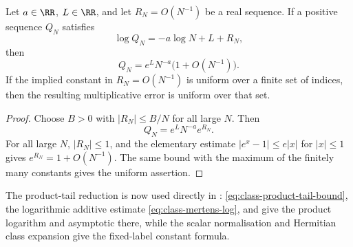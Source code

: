 \begin{lemma}
  \label{lem:class-product-log-to-product-error}
  Let \(a\in\RR\), \(L\in\RR\), and let \(R_N=O(N^{-1})\) be a real sequence.
  If a positive sequence \(Q_N\) satisfies
  \[
    \log Q_N=-a\log N+L+R_N,
  \]
  then
  \[
    Q_N=e^L N^{-a}\bigl(1+O(N^{-1})\bigr).
  \]
  If the implied constant in \(R_N=O(N^{-1})\) is uniform over a finite set of
  indices, then the resulting multiplicative error is uniform over that set.
\end{lemma}

\begin{proof}
  Choose \(B>0\) with \(|R_N|\le B/N\) for all large \(N\).  Then
  \[
    Q_N=e^L N^{-a}e^{R_N}.
  \]
  For all large \(N\), \(|R_N|\le1\), and the elementary estimate
  \(|e^x-1|\le e|x|\) for \(|x|\le1\) gives
  \(e^{R_N}=1+O(N^{-1})\).  The same bound with the maximum of the finitely
  many constants gives the uniform assertion.
\end{proof}

The product-tail reduction is now used directly in
: \eqref{eq:class-product-tail-bound},
the logarithmic additive estimate \eqref{eq:class-mertens-log}, and
 give the product logarithm and
asymptotic there, while the scalar normalisation
 and Hermitian class expansion give
the fixed-label constant formula.

